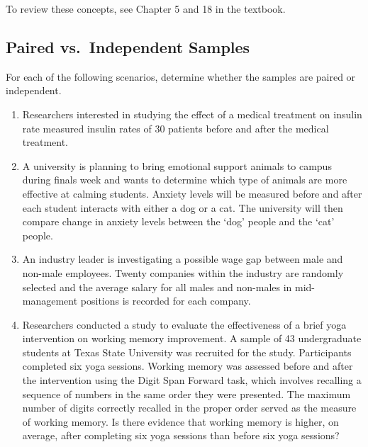 \documentclass[
]{report}
\begin{document}
To review these concepts, see Chapter 5 and 18 in the textbook.

\subsection{Paired vs.~Independent Samples}\label{paired-vs.-independent-samples-1}

For each of the following scenarios, determine whether the samples are paired or independent.

\begin{enumerate}
\def\labelenumi{\arabic{enumi}.}
\item
  Researchers interested in studying the effect of a medical treatment on insulin rate measured insulin rates of 30 patients before and after the medical treatment.
  \vspace{0.3in}
\item
  A university is planning to bring emotional support animals to campus during finals week and wants to determine which type of animals are more effective at calming students. Anxiety levels will be measured before and after each student interacts with either a dog or a cat. The university will then compare change in anxiety levels between the `dog' people and the `cat' people.
  \vspace{0.3in}
\item
  An industry leader is investigating a possible wage gap between male and non-male employees. Twenty companies within the industry are randomly selected and the average salary for all males and non-males in mid-management positions is recorded for each company.
  \vspace{0.3in}
\item
  Researchers conducted a study to evaluate the effectiveness of a brief yoga intervention on working memory improvement. A sample of 43 undergraduate students at Texas State University was recruited for the study. Participants completed six yoga sessions. Working memory was assessed before and after the intervention using the Digit Span Forward task, which involves recalling a sequence of numbers in the same order they were presented. The maximum number of digits correctly recalled in the proper order served as the measure of working memory. Is there evidence that working memory is higher, on average, after completing six yoga sessions than before six yoga sessions?\\
  \vspace{0.3in}
\end{enumerate}
\end{document}
